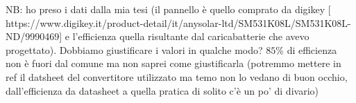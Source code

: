 NB: ho preso i dati dalla mia tesi (il pannello è quello comprato da digikey [ https://www.digikey.it/product-detail/it/anysolar-ltd/SM531K08L/SM531K08L-ND/9990469] e l'efficienza quella risultante dal caricabatterie che avevo progettato). Dobbiamo giustificare i valori in qualche modo? $85\%$ di efficienza non è fuori dal comune ma non saprei come giustificarla (potremmo mettere in ref il datsheet del convertitore utilizzato ma temo non lo vedano di buon occhio, dall'efficienza da datasheet a quella pratica di solito c'è un po' di divario)
